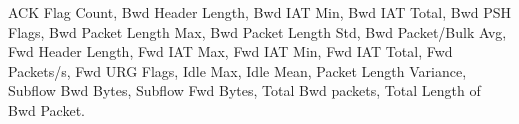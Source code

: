 ACK Flag Count, Bwd Header Length, Bwd IAT Min, Bwd IAT Total, Bwd PSH Flags, Bwd Packet Length Max, Bwd Packet Length Std, Bwd Packet/Bulk Avg, Fwd Header Length, Fwd IAT Max, Fwd IAT Min, Fwd IAT Total, Fwd Packets/s, Fwd URG Flags, Idle Max, Idle Mean, Packet Length Variance, Subflow Bwd Bytes, Subflow Fwd Bytes, Total Bwd packets, Total Length of Bwd Packet.